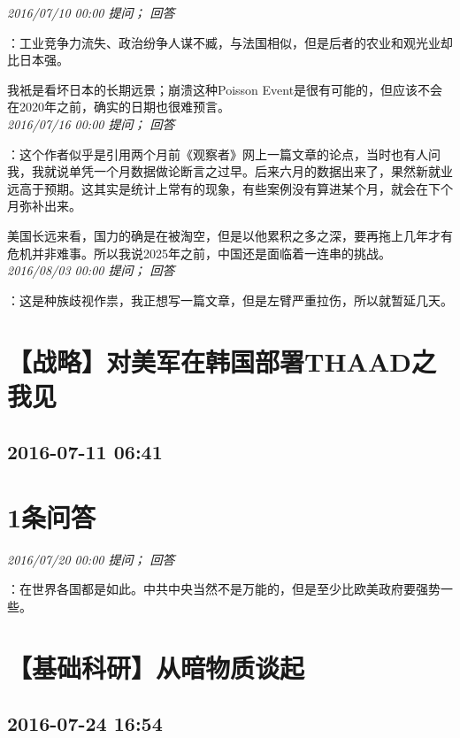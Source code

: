 \documentclass[twocolumn]{ctexart}
\begin{document}
\textit{\hfill\noindent\small 2016/07/10 00:00 提问； 回答}

：工业竞争力流失、政治纷争人谋不臧，与法国相似，但是后者的农业和观光业却比日本强。

我衹是看坏日本的长期远景；崩溃这种Poisson Event是很有可能的，但应该不会在2020年之前，确实的日期也很难预言。\\

\textit{\hfill\noindent\small 2016/07/16 00:00 提问； 回答}

：这个作者似乎是引用两个月前《观察者》网上一篇文章的论点，当时也有人问我，我就说单凭一个月数据做论断言之过早。后来六月的数据出来了，果然新就业远高于预期。这其实是统计上常有的现象，有些案例没有算进某个月，就会在下个月弥补出来。

美国长远来看，国力的确是在被淘空，但是以他累积之多之深，要再拖上几年才有危机并非难事。所以我说2025年之前，中国还是面临着一连串的挑战。\\

\textit{\hfill\noindent\small 2016/08/03 00:00 提问； 回答}

：这是种族歧视作祟，我正想写一篇文章，但是左臂严重拉伤，所以就暂延几天。\\


\section{【战略】对美军在韩国部署THAAD之我见 }
\subsection{2016-07-11 06:41}


\section{1条问答}

\textit{\hfill\noindent\small 2016/07/20 00:00 提问； 回答}

：在世界各国都是如此。中共中央当然不是万能的，但是至少比欧美政府要强势一些。\\


\section{【基础科研】从暗物质谈起}
\subsection{2016-07-24 16:54}
\end{document}
